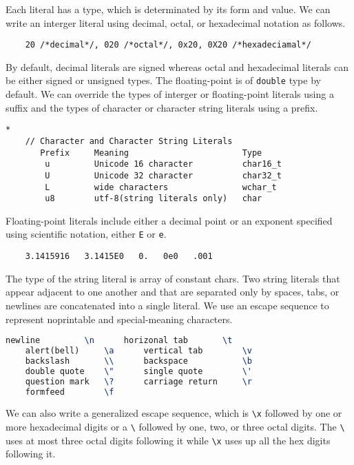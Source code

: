 \documentclass[11pt]{ctexart}
\begin{document}
Each literal has a type, which is determinated by its form and value. We can write an interger literal using decimal, octal, or hexadecimal notation as follows.\begin{lstlisting}
    20 /*decimal*/, 020 /*octal*/, 0x20, 0X20 /*hexadeciamal*/
\end{lstlisting}
By default, decimal literals are signed whereas octal and hexadecimal literals can be either signed or unsigned types. The floating-point is of \verb|double| type by default. We can override the types of interger or floating-point literals using a suffix and the types of character or character string literals using a prefix.\begin{lstlisting}*
    // Character and Character String Literals
       Prefix     Meaning                       Type
        u         Unicode 16 character          char16_t
        U         Unicode 32 character          char32_t
        L         wide characters               wchar_t
        u8        utf-8(string literals only)   char
\end{lstlisting}
Floating-point literals include either a decimal point or an exponent specified using scientific notation, either \verb|E| or \verb|e|.\begin{lstlisting}
    3.1415916   3.1415E0   0.   0e0   .001
\end{lstlisting}
The type of the string literal is array of constant chars. Two string literals that appear adjacent to one another and that are separated only
by spaces, tabs, or newlines are concatenated into a single literal. We use an escape sequence to represent noprintable and special-meaning characters.\begin{lstlisting}[language=TeX]
    newline         \n      horizonal tab       \t
    alert(bell)     \a      vertical tab        \v
    backslash       \\      backspace           \b
    double quote    \"      single quote        \'
    question mark   \?      carriage return     \r
    formfeed        \f    
\end{lstlisting}We can also write a generalized escape sequence, which is \verb|\x| followed by one or
more hexadecimal digits or a \verb|\| followed by one, two, or three octal digits. The \verb|\| uses at most three octal digits following it while \verb|\x| uses up all the hex digits following it.
\end{document}
